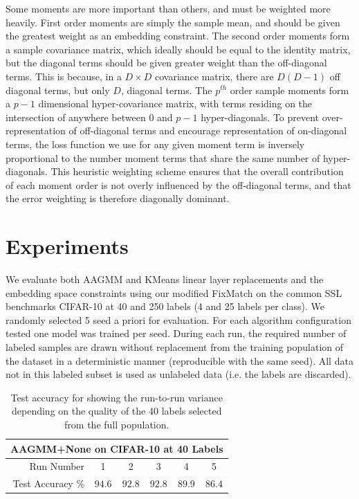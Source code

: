 \documentclass[10pt,twocolumn,letterpaper]{article}
\begin{document}
Some moments are more important than others, and must be weighted more heavily.  
First order moments are simply the sample mean, and should be given the greatest weight as an embedding constraint.  
The second order moments form a sample covariance matrix, which ideally should be equal to the identity matrix, but the diagonal terms should be given greater weight than the off-diagonal terms.  
This is because, in a $D \times D$ covariance matrix, there are $D(D-1)$ off diagonal terms, but only $D$, diagonal terms.  
The $p^{th}$ order sample moments form a $p-1$ dimensional hyper-covariance matrix, with terms residing on the intersection of anywhere between $0$ and $p-1$ hyper-diagonals.  
To prevent over-representation of off-diagonal terms and encourage representation of on-diagonal terms, the loss function we use for any given moment term is inversely proportional to the number moment terms that share the same number of hyper-diagonals.  
This heuristic weighting scheme ensures that the overall contribution of each moment order is not overly influenced by the off-diagonal terms, and that the error weighting is therefore diagonally dominant.

\section{Experiments}

We evaluate both AAGMM and KMeans linear layer replacements and the embedding space constraints using our modified FixMatch\cite{sohn2020fixmatch} on the common SSL benchmarks CIFAR-10 \cite{cifar10} at 40 and 250 labels (4 and 25 labels per class). 
We randomly selected 5 seed a priori for evaluation.
For each algorithm configuration tested one model was trained per seed.
During each run, the required number of labeled samples are drawn without replacement from the training population of the dataset in a deterministic manner (reproducible with the same seed).
All data not in this labeled subset is used as unlabeled data (i.e. the labels are discarded).


\begin{table}[h!]
	\begin{tabular}{r|c|c|c|c|c}
		\multicolumn{6}{c}{AAGMM+None on CIFAR-10 at 40 Labels}\\
		\hline
		Run Number & 1 & 2 & 3 & 4 & 5 \\
		\hline
		Test Accuracy \% & $94.6$ & $92.8$ & $92.8$ & $89.9$ & $86.4$ \\
	\end{tabular}
	\caption{Test accuracy for showing the run-to-run variance depending on the quality of the 40 labels selected from the full population.}
	\label{tab:runvariability}
\end{table}
\end{document}

